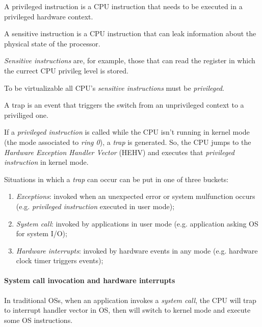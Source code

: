 \begin{definition}
    A privileged instruction is a CPU instruction that needs to be executed in
    a privileged hardware context.
\end{definition}
\begin{definition}
    A sensitive instruction is a CPU instruction that can leak information about
    the physical state of the processor.
\end{definition}
\begin{note}
    \emph{Sensitive instructions} are, for example, those that can read the
    register in which the currect CPU privileg level is stored.
\end{note}\noindent
To be virtualizable all CPU's \emph{sensitive instructions} must be
\emph{privileged}.

\begin{definition}[Trap]
    A trap is an event that triggers the switch from an unprivileged context to
    a priviliged one.
\end{definition}\noindent
If a \emph{privileged instruction} is called while the CPU isn't running in
kernel mode (the mode associated to \emph{ring 0}), a \emph{trap} is generated.
So, the CPU jumps to the \emph{Hardware Exception Handler Vector} (HEHV) and
executes that \emph{privileged instruction} in kernel mode.

Situations in which a \emph{trap} can occur can be put in one of three buckets:
\begin{enumerate}
    \item\emph{Exceptions}: invoked when an unexpected error or system mulfunction
    occurs (e.g. \emph{privileged instruction} executed in user mode);
    \item\emph{System call}: invoked by applications in user mode (e.g.
    application asking OS for system I/O);
    \item\emph{Hardware interrupts}: invoked by hardware events in any mode
    (e.g. hardware clock timer triggers events);
\end{enumerate}

\paragraph{System call invocation and hardware interrupts}
In traditional OSs, when an application invokes a \emph{system call}, the CPU
will trap to interrupt handler vector in OS, then will switch to kernel mode
and execute some OS instructions.

